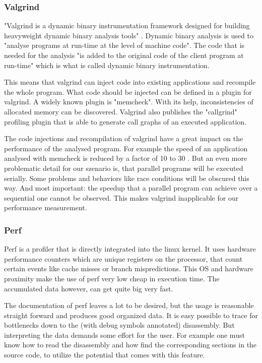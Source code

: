 \subsubsection{Valgrind}
"Valgrind is a dynamic binary instrumentation framework designed for building heavyweight dynamic binary analysis tools" \cite{nethercote2007valgrind}. Dynamic binary analysis is used to "analyse programs at run-time at the level of machine code". The code that is needed for the analysis "is added to the original code of the client program at run-time" which is what is called dynamic binary instrumentation.

This means that valgrind can inject code into existing applications and recompile the whole program. What code should be injected can be defined in a plugin for valgrind. A widely known plugin is "memcheck". With its help, inconsistencies of allocated memory can be discovered. Valgrind also publishes the "callgrind" profiling plugin that is able to generate call graphs of an executed application.

The code injections and recompilation of valgrind have a great impact on the performance of the analysed program. For example the speed of an application analysed with memcheck is reduced by a factor of 10 to 30 \cite{valgrindTools}. But an even more problematic detail for our szenario is, that parallel programs will be executed serially. Some problems and behaviors like race conditions will be obscured this way. And most important: the speedup that a parallel program can achieve over a sequential one cannot be observed. This makes valgrind inapplicable for our performance measurement.

\subsubsection{Perf}
Perf is a profiler that is directly integrated into the linux kernel. It uses hardware performance counters which are unique registers on the processor, that count certain events like cache misses or branch mispredictions. This OS and hardware proximity make the use of perf very low cheap in execution time. The accumulated data however, can get quite big very fast.

The documentation of perf leaves a lot to be desired, but the usage is reasonable straight forward and produces good organized data. It is easy possible to trace for bottlenecks down to the (with debug symbols annotated) disassembly. But interpreting the data demands some effort for the user. For example one must know how to read the disassembly and how find the corresponding sections in the source code, to utilize the potential that comes with this feature.

